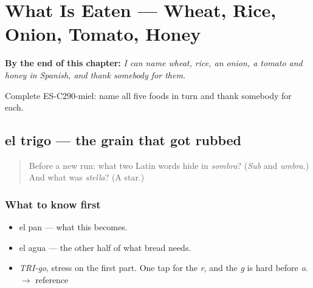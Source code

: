 
\chapter{What Is Eaten --- Wheat, Rice, Onion, Tomato, Honey}
\label{ch:lo-que-se-come}

\begin{chapteropening}
\textbf{By the end of this chapter:} \emph{I can name wheat, rice, an onion, a tomato and honey in Spanish, and thank somebody for them.}

Complete ES-C290-miel: name all five foods in turn and thank somebody for each.
\end{chapteropening}

\section[el trigo]{el trigo — the grain that got rubbed}

\label{lesson:ES-C290-trigo}



\begin{quote}
Before a new run: what two Latin words hide in \emph{sombra}? (\emph{Sub} and \emph{umbra}.) And what was \emph{stella}? (A star.)
\end{quote}

\subsection*{What to know first}
\begin{itemize}
\raggedright
  \item el pan — what this becomes.
  \item el agua — the other half of what bread needs.
\end{itemize}

\begin{sounds}
\begin{itemize}
\raggedright
  \item \emph{TRI-go}, stress on the first part. One tap for the \emph{r}, and the \emph{g} is hard before \emph{o}. $\to$ reference
\end{itemize}
\end{sounds}

